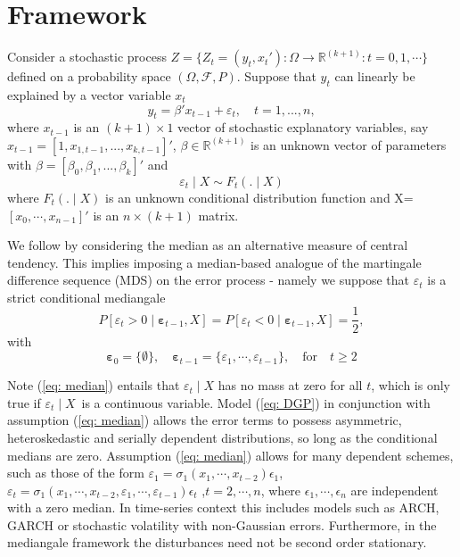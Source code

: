 \documentclass[harvard,11pt]{article}
\newcommand{\R}{\mathbb{R}}
\begin{document}
\section{Framework \label{Framework}}


 Consider a stochastic process $Z=\{Z_t=(y_t,x_{t}'):\Omega\rightarrow\R^{(k+1)}:t=0,1,\cdots\}$ defined on a probability space $(\Omega,\mathcal{F},P)$. Suppose that $y_{t}$ can linearly be explained by a vector variable $x_{t}$%
\begin{equation}
y_{t}=\beta'x_{t-1}+\varepsilon_{t},\quad t=1,...,n,  \label{eq: DGP}
\end{equation}%
where $x_{t-1}$ is an $(k+1)\times 1$ vector of stochastic explanatory 
variables, say $x_{t-1}=[1,x_{1,t-1},...,x_{k,t-1}]'$, $\beta \in \mathbb{R}^{(k+1)}$ is an unknown vector of parameters with $\beta=[\beta_0,\beta_1,...,\beta_k]'$ and
\[
 \varepsilon_t\mid X\sim F_t(.\mid X)
\] 
where $F_{t}(.\mid X)$ is an unknown conditional distribution function and X=$[x_0,\cdots,x_{n-1}]'$ is an $n\times (k+1)$ matrix. 

We follow \citet{coudin2009finite} by considering the median as an alternative measure of central tendency. This implies imposing a median-based analogue of the martingale difference sequence (MDS) on the error process - namely we suppose that $\varepsilon_t$ is a strict conditional mediangale
\begin{equation}\label{eq: median}
P[\varepsilon_{t}> 0\mid \bm{{\varepsilon}}_{t-1},X]=P[\varepsilon_{t}<0\mid \bm{\varepsilon}_{t-1},X]=\frac{1}{2},
\end{equation}%
with
\[
\bm{\varepsilon}_{0}=\{\emptyset\},\quad\bm{\varepsilon}_{t-1}=\{\varepsilon_1,\cdots,\varepsilon_{t-1}\},\quad\text{for}\quad t\geq2
\]

 Note (\ref{eq: median}) entails
that $\varepsilon _{t}\mid X$ has no mass at zero for all $t$, which is only true if $\varepsilon_{t}\mid X$\ is a
continuous variable. Model (\ref{eq: DGP}) in conjunction with assumption (\ref{eq: median}) allows the error terms to possess asymmetric, heteroskedastic and serially dependent distributions, so long as the conditional medians are zero. Assumption (\ref{eq: median}) allows for many dependent schemes, such as those of the form $\varepsilon_1=\sigma_1(x_1,\cdots,x_{t-2})\epsilon_1$, $\varepsilon_t=\sigma_1(x_1,\cdots,x_{t-2},\varepsilon_1,\cdots,\varepsilon_{t-1})\epsilon_t$ ,$t=2,\cdots,n$, where $\epsilon_1,\cdots,\epsilon_n$ are independent with a zero median. In time-series context this includes models such as ARCH, GARCH or stochastic volatility with non-Gaussian errors. Furthermore, in the mediangale framework the disturbances need not be second order stationary. 
\end{document}
